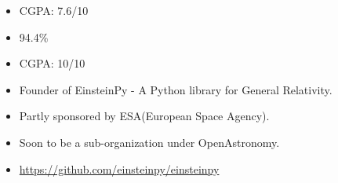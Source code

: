 


\begin{itemize}
    \item CGPA: 7.6/10
\end{itemize}

\divider

\begin{itemize}
    \item 94.4\%
\end{itemize}

\divider

\begin{itemize}
    \item CGPA: 10/10
\end{itemize}

\smallskip
\smallskip









\begin{itemize}
\item Founder of EinsteinPy - A Python library for General Relativity.
\item Partly sponsored by ESA(European Space Agency).
\item Soon to be a sub-organization under OpenAstronomy.
\item \href{https://github.com/einsteinpy/einsteinpy}{https://github.com/einsteinpy/einsteinpy}
\end{itemize}
\smallskip
\smallskip

